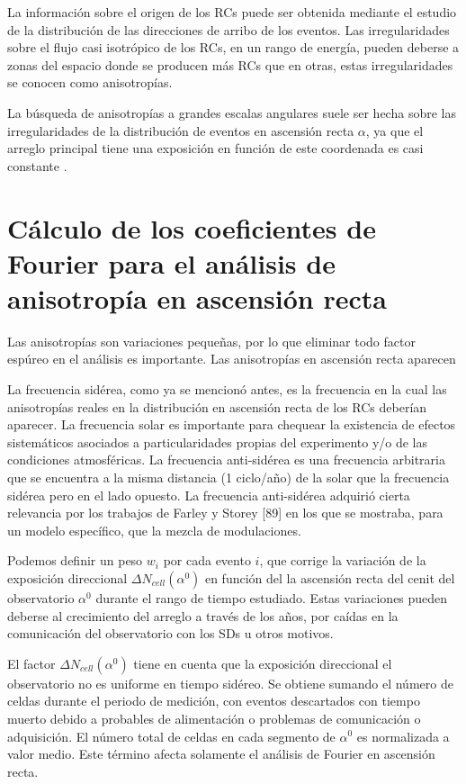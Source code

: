 La información sobre el origen de los RCs puede ser obtenida mediante el estudio de la distribución de las direcciones de arribo de los eventos. Las irregularidades sobre el flujo casi isotrópico de los RCs, en un rango de energía, pueden deberse a  zonas del espacio donde se producen más RCs que en otras, estas irregularidades se conocen como anisotropías. 

La búsqueda de anisotropías a grandes escalas angulares suele ser hecha sobre las irregularidades de la distribución de eventos en ascensión recta $\alpha$, ya que el arreglo principal tiene una exposición en función de este coordenada es casi constante \cite{referencia_anis}.

\section{Cálculo de los coeficientes de Fourier para el análisis de anisotropía en ascensión recta}

Las anisotropías son variaciones pequeñas, por lo que eliminar todo factor espúreo en el análisis es importante. Las anisotropías en ascensión recta  aparecen 

La frecuencia sidérea, como ya se mencionó antes, es la frecuencia en la cual las anisotropías reales en la distribución en ascensión recta de los RCs deberían aparecer. La frecuencia solar es importante para chequear la existencia de efectos sistemáticos asociados a particularidades propias del experimento y/o de las condiciones atmosféricas. La frecuencia anti-sidérea es una frecuencia arbitraria que se encuentra a la misma distancia (1 ciclo/año) de la solar que la frecuencia sidérea pero en el lado opuesto. La frecuencia anti-sidérea adquirió cierta relevancia por los trabajos de Farley y Storey [89] en los que se mostraba, para un modelo específico, que la mezcla de modulaciones.


Podemos definir un peso  $w_i$ por cada evento $i$, que corrige la variación de la exposición direccional $\Delta N_{cell}(\alpha^0)$ en función del la ascensión recta del cenit del observatorio $\alpha^0$ durante el rango de tiempo estudiado. Estas variaciones pueden deberse al crecimiento del arreglo a través de los años,  por caídas en la comunicación del observatorio con los SDs u otros motivos. 

El factor $\Delta N _{cell}(\alpha^0)$ tiene en cuenta que la exposición  direccional  el observatorio no es uniforme en tiempo sidéreo.  Se obtiene sumando el número de celdas durante el periodo de medición, con eventos descartados con tiempo muerto debido a probables de alimentación o problemas de comunicación o adquisición.  El número total de celdas en cada segmento de $\alpha^0$ es normalizada a valor medio. Este término afecta solamente el análisis de Fourier en ascensión recta.

